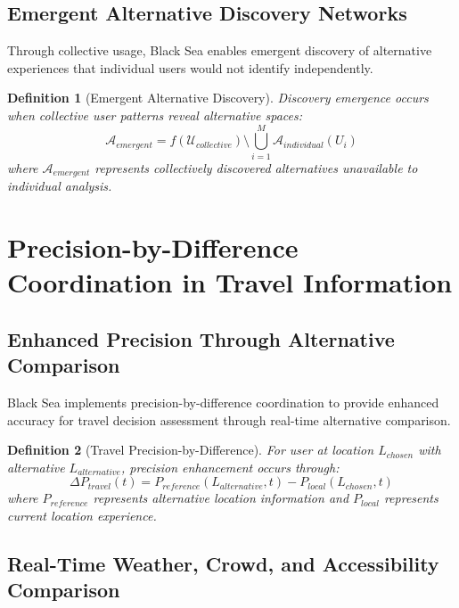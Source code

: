\documentclass[12pt,a4paper]{article}
\newtheorem{definition}{Definition}
\begin{document}
\subsection{Emergent Alternative Discovery Networks}

Through collective usage, Black Sea enables emergent discovery of alternative experiences that individual users would not identify independently.

\begin{definition}[Emergent Alternative Discovery]
Discovery emergence occurs when collective user patterns reveal alternative spaces:
\begin{equation}
\mathcal{A}_{emergent} = f(\mathcal{U}_{collective}) \setminus \bigcup_{i=1}^M \mathcal{A}_{individual}(U_i)
\end{equation}
where $\mathcal{A}_{emergent}$ represents collectively discovered alternatives unavailable to individual analysis.
\end{definition}

\section{Precision-by-Difference Coordination in Travel Information}

\subsection{Enhanced Precision Through Alternative Comparison}

Black Sea implements precision-by-difference coordination to provide enhanced accuracy for travel decision assessment through real-time alternative comparison.

\begin{definition}[Travel Precision-by-Difference]
For user at location $L_{chosen}$ with alternative $L_{alternative}$, precision enhancement occurs through:
\begin{equation}
\Delta P_{travel}(t) = P_{reference}(L_{alternative}, t) - P_{local}(L_{chosen}, t)
\end{equation}
where $P_{reference}$ represents alternative location information and $P_{local}$ represents current location experience.
\end{definition}

\subsection{Real-Time Weather, Crowd, and Accessibility Comparison}
\end{document}
